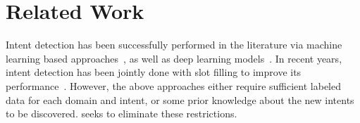 \section{Related Work} 
\label{sec:background}



Intent detection has been successfully performed in the literature via machine learning based approaches~\cite{tur2011sentence,jeong2008triangular,kim2016intent,ravuri2015comparative}, as well as deep learning models~\cite{sun2016weakly,xia2018,shivakumar2019spoken,castellucci2019multi,lin2019deep}. %
In recent years, intent detection has been jointly done with slot filling to improve its performance~\cite{xu2013convolutional,bhargava2013,liu2016attention,zhang2016joint,kim2017onenet,goo2018slot,wang2018bi}. However, the above approaches either require sufficient labeled data for each domain and intent, or some prior knowledge about the new intents to be discovered. \mname{} seeks to eliminate these restrictions.


